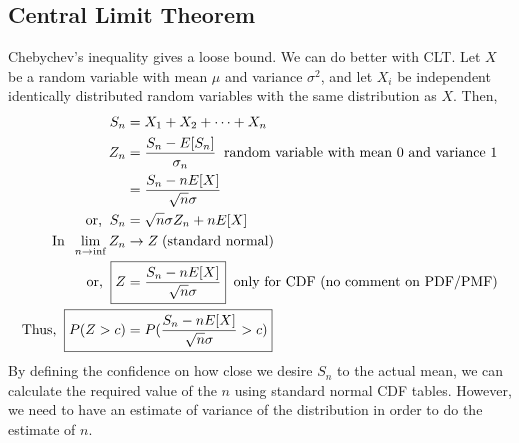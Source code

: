 \documentclass[11pt, a4paper]{article}
\begin{document}
    \subsection{Central Limit Theorem}
    Chebychev's inequality gives a loose bound. We can do better with CLT. Let $X$ be a random variable with mean $\mu$ and variance $\sigma^{2}$, and let $X_{i}$ be independent identically distributed random variables with the same distribution as $X$. Then,
    \begin{align*}
        S_{n} &= X_{1} + X_{2} + \cdots + X_{n}\\
        Z_{n} &= \frac{S_{n} - E[S_{n}]}{\sigma_{n}} \text{\;\;random variable with mean $0$ and variance $1$} \\
             &= \frac{S_{n} - nE[X]}{\sqrt{n} \sigma}\\
        \text{or,\;\;} S_{n} &= \sqrt{n} \sigma Z_{n} + nE[X] \\
        \text{In\;\;} \lim_{n \to \inf} Z_{n} &\rightarrow Z \text{\;(standard normal)}\\
        \text{or,\;\;} \Aboxed{Z &= \frac{S_{n} - nE[X]}{\sqrt{n} \sigma}} \text{\;\;only for CDF (no comment on PDF/PMF)}\\
        \text{Thus,\;\;} \Aboxed{P(Z > c) &= P(\frac{S_{n} - nE[X]}{\sqrt{n} \sigma} > c)}
    \end{align*}
    By defining the confidence on how close we desire $S_{n}$ to the actual mean, we can calculate the required value of the $n$ using standard normal CDF tables. However, we need to have an estimate of variance of the distribution in order to do the estimate of $n$.


\end{document}
